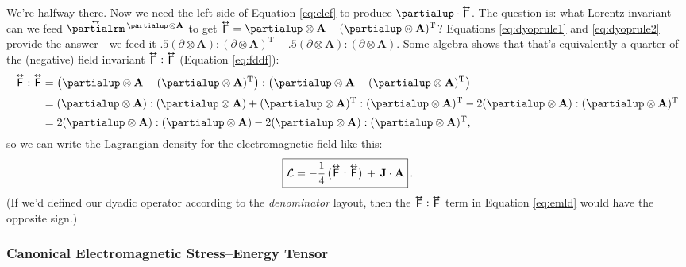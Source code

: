 \documentclass[12pt]{article}
\renewcommand{\vv}[1]{\mathbf{#1}}
\newcommand{\tightoverset}[2]{%
  \mathop{#2}\limits^{\vbox to -.5ex{\kern-0.75ex\hbox{$#1$}\vss}}}
\newcommand{\inlinedy}[1]{\tightoverset{\text{\tiny$\bm\leftrightarrow$}}{#1}}
\newcommand{\capdy}[1]{ \overset{ \text{\tiny$\bm\leftrightarrow$} }{\vphantom{\text{\small{A}}}\smash{#1}} }
\begin{document}
We're halfway there. Now we need the left side of Equation \ref{eq:elef} to produce $\partialup \cdot \inlinedy{\mathsf{F}}$. The question is: what Lorentz invariant can we feed $\inlinedy{\partialrm} {}^{\partialup \mkern2mu \otimes \vv A}$ to get $\inlinedy{\mathsf{F}} = \partialup \otimes \vv A - (\partialup \otimes \vv A)^\mathrm{T}$? Equations \ref{eq:dyoprule1} and \ref{eq:dyoprule2} provide the answer---we feed it $ .5(\partialup \otimes \vv A):(\partialup \otimes \vv A)^\mathrm{T} - .5(\partialup \otimes \vv A):(\partialup \otimes \vv A) $. Some algebra shows that that's equivalently a quarter of the (negative) field invariant $ \inlinedy{\mathsf{F}} : \inlinedy{\mathsf{F}} $ (Equation \ref{eq:fddf}):
\begin{equation*}
\begin{aligned}
\capdy{\mathsf{F}} : \capdy{\mathsf{F}} &= \left( \partialup \otimes \vv A - (\partialup \otimes \vv A)^\mathrm{T} \right) : \left( \partialup \otimes \vv A - (\partialup \otimes \vv A)^\mathrm{T} \right) \\[2pt]
&= (\partialup \otimes \vv A):(\partialup \otimes \vv A) + (\partialup \otimes \vv A)^\mathrm{T} : (\partialup \otimes \vv A)^\mathrm{T}  - 2 (\partialup \otimes \vv A):(\partialup \otimes \vv A)^\mathrm{T} \\[2pt]
&= 2 (\partialup \otimes \vv A):(\partialup \otimes \vv A) - 2 (\partialup \otimes \vv A):(\partialup \otimes \vv A)^\mathrm{T},
\end{aligned}
\end{equation*}
so we can write the Lagrangian density for the electromagnetic field like this:
\begin{equation}\label{eq:emld}
\boxed{\mathcal{L} = - \dfrac{1}{4} \, ( \capdy{\mathsf{F}} : \capdy{\mathsf{F}} ) \, + \, \vv J \cdot \vv A} \, .
\end{equation}
(If we'd defined our dyadic operator according to the \emph{denominator} layout, then the $\inlinedy{\mathsf{F}} : \inlinedy{\mathsf{F}}$ term in Equation \ref{eq:emld} would have the opposite sign.)

\subsubsection{Canonical Electromagnetic Stress--Energy Tensor}
\end{document}
